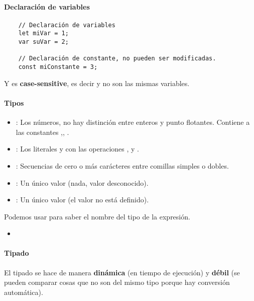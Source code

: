 \paragraph{Declaración de variables}
\begin{centrado}
	\begin{verbatim}
	// Declaración de variables
	let miVar = 1;
	var suVar = 2;
	
	// Declaración de constante, no pueden ser modificadas.
	const miConstante = 3; 
	\end{verbatim}
\end{centrado}

Y es \textbf{case-sensitive}, es decir  y  no son las mismas variables.

\paragraph{Tipos}

\begin{itemize}
	\item {}: Los números, no hay distinción entre enteros y punto flotantes. Contiene a las constantes ,, .
	\item {}: Los literales  y  con las operaciones \javascript{\&\&}, \javascript{!} y \javascript{||}.
	\item {}: Secuencias de cero o más carácteres entre comillas simples o dobles.
	\item {}: Un único valor  (nada, valor desconocido).
	\item {}: Un único valor  (el valor no está definido).
\end{itemize}

Podemos usar  para saber el nombre del tipo de la expresión.

\begin{itemize}
\item {} 

\end{itemize}

\paragraph{Tipado}
El tipado se hace de manera \textbf{dinámica} (en tiempo de ejecución) y \textbf{débil} (se pueden comparar cosas que no son del mismo tipo porque hay conversión automática).

